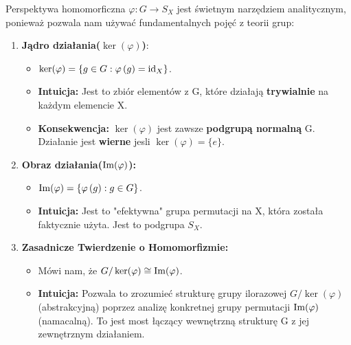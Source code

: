 \begin{intuition}
	Perspektywa homomorficzna $\varphi: G\rightarrow S_{X}$ jest świetnym narzędziem analitycznym, ponieważ pozwala nam używać fundamentalnych pojęć z teorii grup:
	\begin{enumerate}[label=\Roman*.]
		\item \textbf{Jądro działania($\ker(\varphi) $)}:
			\begin{itemize}
				\item $\ker(\varphi) = \{g \in G: \varphi\left( g \right) = \operatorname{id}_{X}\} $.
				\item \textbf{Intuicja:} Jest to zbiór elementów z G, które działają \textbf{trywialnie} na każdym elemencie X.
				\item \textbf{Konsekwencja:} $\ker(\varphi) $ jest zawsze  \textbf{podgrupą normalną} G. Działanie jest \textbf{wierne} jesli $\ker(\varphi) = \{e\} $.
			\end{itemize}
		\item \textbf{Obraz działania($\operatorname{Im}(\varphi)$):}
			\begin{itemize}
				\item $\operatorname{Im}(\varphi) = \{\varphi\left( g \right) : g\in G\} $.
				\item \textbf{Intuicja: } Jest to "efektywna" grupa permutacji na X, która została faktycznie użyta. Jest to podgrupa $S_{X}$.
			\end{itemize}
		\item \textbf{Zasadnicze Twierdzenie o Homomorfizmie: }
			\begin{itemize}
				\item Mówi nam, że $G/\ker(\varphi) \cong \operatorname{Im}(\varphi)  $.
				\item \textbf{Intuicja: } Pozwala to zrozumieć strukturę grupy ilorazowej $G / \ker(\varphi) $ (abstrakcyjną) poprzez analizę konkretnej grupy permutacji $\operatorname{Im}(\varphi) $ (namacalną). To jest most łączący wewnętrzną strukturę G z jej zewnętrznym działaniem.
			\end{itemize}
	\end{enumerate}
\end{intuition}


